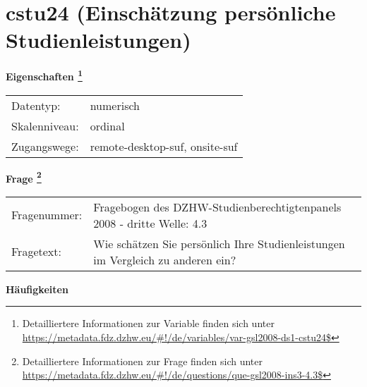 
    \setcounter{footnote}{0}

    \vspace*{-1.8cm}
	\section{cstu24 (Einschätzung persönliche Studienleistungen)}
	\label{section:cstu24}



    \vspace*{0.5cm}
    \noindent\textbf{Eigenschaften
	\footnote{Detailliertere Informationen zur Variable finden sich unter
		\url{https://metadata.fdz.dzhw.eu/\#!/de/variables/var-gsl2008-ds1-cstu24$}}}\\
	\begin{tabularx}{\hsize}{@{}lX}
	Datentyp: & numerisch \\
	Skalenniveau: & ordinal \\
	Zugangswege: &
	  remote-desktop-suf, 
	  onsite-suf
 \\
    \end{tabularx}



				\vspace*{0.5cm}
                \noindent\textbf{Frage
	                \footnote{Detailliertere Informationen zur Frage finden sich unter
		              \url{https://metadata.fdz.dzhw.eu/\#!/de/questions/que-gsl2008-ins3-4.3$}}}\\
				\begin{tabularx}{\hsize}{@{}lX}
					Fragenummer: &
					  Fragebogen des DZHW-Studienberechtigtenpanels 2008 - dritte Welle:
					  4.3
 \\
					Fragetext: & Wie schätzen Sie persönlich Ihre Studienleistungen im Vergleich zu anderen ein? \\
				\end{tabularx}





        		\vspace*{0.5cm}
                \noindent\textbf{Häufigkeiten}

